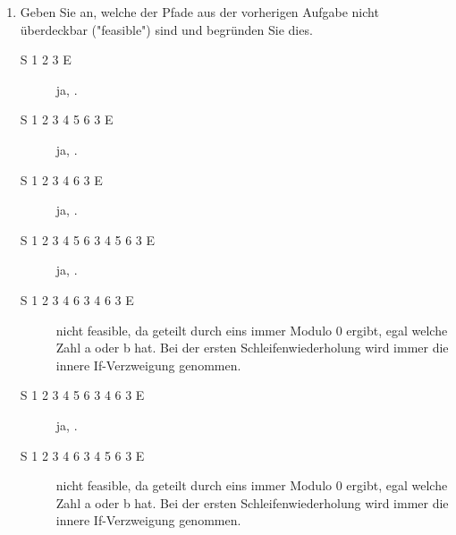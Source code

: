 \documentclass{lehramt-informatik-aufgabe}
\begin{document}
\begin{enumerate}
%

\item Geben Sie an, welche der Pfade aus der vorherigen Aufgabe nicht
überdeckbar ("feasible") sind und begründen Sie dies.

\begin{liAntwort}

\begin{description}
\item[S 1 2 3 E]
ja, \zB {}.
\end{description}


\begin{description}
\item[S 1 2 3 4 5 6 3 E]
ja, \zB {}.

\item[S 1 2 3 4 6 3 E]
ja, \zB {}.
\end{description}


\begin{description}
\item[S 1 2 3 4 5 6 3 4 5 6 3 E]
ja, \zB {}.

\item[S 1 2 3 4 6 3 4 6 3 E]
nicht feasible, da geteilt durch eins immer Modulo 0 ergibt, egal welche
Zahl a oder b hat. Bei der ersten Schleifenwiederholung wird immer die
innere If-Verzweigung genommen.

\item[S 1 2 3 4 5 6 3 4 6 3 E]
ja, \zB {}.

\item[S 1 2 3 4 6 3 4 5 6 3 E]
nicht feasible, da geteilt durch eins immer Modulo 0 ergibt, egal welche
Zahl a oder b hat. Bei der ersten Schleifenwiederholung wird immer die
innere If-Verzweigung genommen.
\end{description}
\end{liAntwort}

\end{enumerate}
\end{document}
